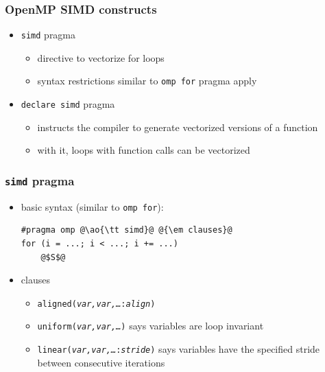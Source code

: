 \documentclass[12pt,dvipdfmx]{beamer}
\newcommand{\ao}[1]{{\color{blue}#1}}
\begin{document}
\begin{frame}[fragile]
\frametitle{OpenMP SIMD constructs}
\begin{itemize}
\item \ao{\tt simd} pragma
  \begin{itemize}
  \item directive to vectorize for loops
  \item syntax restrictions similar to {\tt omp for} pragma apply
  \end{itemize}

\item \ao{\tt declare simd} pragma
  \begin{itemize}
  \item instructs the compiler to generate vectorized versions of a function
  \item with it, loops with function calls can be vectorized
  \end{itemize}
\end{itemize}
\end{frame}

\begin{frame}[fragile]
\frametitle{{\tt simd} pragma}
\begin{itemize}
\item basic syntax (similar to {\tt omp for}):
\begin{lstlisting}
#pragma omp @\ao{\tt simd}@ @{\em clauses}@
for (i = ...; i < ...; i += ...) 
    @$S$@
\end{lstlisting}

\item clauses
  \begin{itemize}
  \item {\tt aligned({\it var,var,\ldots}:{\it align})}
  \item {\tt uniform({\it var,var,\ldots})} says variables are loop invariant
  \item {\tt linear({\it var,var,\ldots}:{\it stride})} 
    says variables have the specified stride between consecutive iterations
  \end{itemize}
\end{itemize}
\end{frame}
\end{document}
